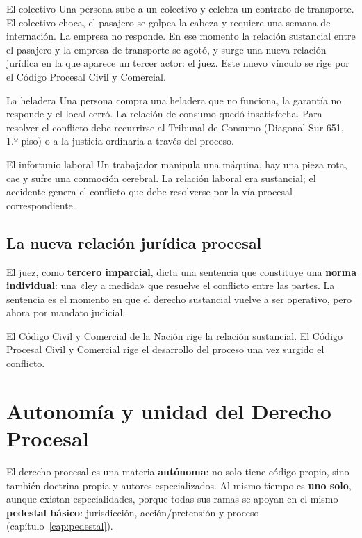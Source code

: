 \documentclass[12pt,oneside]{book}
\begin{document}
\begin{ejemplo}{El colectivo}
Una persona sube a un colectivo y celebra un contrato de transporte. El colectivo choca, el pasajero se golpea la cabeza y requiere una semana de internación. La empresa no responde. En ese momento la relación sustancial entre el pasajero y la empresa de transporte se agotó, y surge una nueva relación jurídica en la que aparece un tercer actor: el juez. Este nuevo vínculo se rige por el Código Procesal Civil y Comercial.
\end{ejemplo}

\begin{ejemplo}{La heladera}
Una persona compra una heladera que no funciona, la garantía no responde y el local cerró. La relación de consumo quedó insatisfecha. Para resolver el conflicto debe recurrirse al Tribunal de Consumo (Diagonal Sur 651, 1.º piso) o a la justicia ordinaria a través del proceso.
\end{ejemplo}

\begin{ejemplo}{El infortunio laboral}
Un trabajador manipula una máquina, hay una pieza rota, cae y sufre una conmoción cerebral. La relación laboral era sustancial; el accidente genera el conflicto que debe resolverse por la vía procesal correspondiente.
\end{ejemplo}

\subsection{La nueva relación jurídica procesal}

El juez, como \textbf{tercero imparcial}, dicta una sentencia que constituye una \textbf{norma individual}: una «ley a medida» que resuelve el conflicto entre las partes. La sentencia es el momento en que el derecho sustancial vuelve a ser operativo, pero ahora por mandato judicial.

\begin{importante}
El Código Civil y Comercial de la Nación rige la relación sustancial. El Código Procesal Civil y Comercial rige el desarrollo del proceso una vez surgido el conflicto.
\end{importante}

\section{Autonomía y unidad del Derecho Procesal}

El derecho procesal es una materia \textbf{autónoma}: no solo tiene código propio, sino también doctrina propia y autores especializados. Al mismo tiempo es \textbf{uno solo}, aunque existan especialidades, porque todas sus ramas se apoyan en el mismo \textbf{pedestal básico}: jurisdicción, acción/pretensión y proceso (capítulo~\ref{cap:pedestal}).
\end{document}
